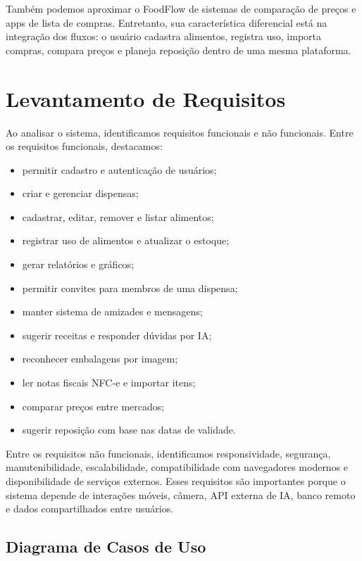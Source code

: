 \documentclass[12pt]{article}
\begin{document}
Também podemos aproximar o FoodFlow de sistemas de comparação de preços e apps de lista de compras. Entretanto, sua característica diferencial está na integração dos fluxos: o usuário cadastra alimentos, registra uso, importa compras, compara preços e planeja reposição dentro de uma mesma plataforma.

\section{Levantamento de Requisitos}

Ao analisar o sistema, identificamos requisitos funcionais e não funcionais. Entre os requisitos funcionais, destacamos:

\begin{itemize}
    \item permitir cadastro e autenticação de usuários;
    \item criar e gerenciar dispensas;
    \item cadastrar, editar, remover e listar alimentos;
    \item registrar uso de alimentos e atualizar o estoque;
    \item gerar relatórios e gráficos;
    \item permitir convites para membros de uma dispensa;
    \item manter sistema de amizades e mensagens;
    \item sugerir receitas e responder dúvidas por IA;
    \item reconhecer embalagens por imagem;
    \item ler notas fiscais NFC-e e importar itens;
    \item comparar preços entre mercados;
    \item sugerir reposição com base nas datas de validade.
\end{itemize}

Entre os requisitos não funcionais, identificamos responsividade, segurança, manutenibilidade, escalabilidade, compatibilidade com navegadores modernos e disponibilidade de serviços externos. Esses requisitos são importantes porque o sistema depende de interações móveis, câmera, API externa de IA, banco remoto e dados compartilhados entre usuários.

\subsection{Diagrama de Casos de Uso}
\end{document}
